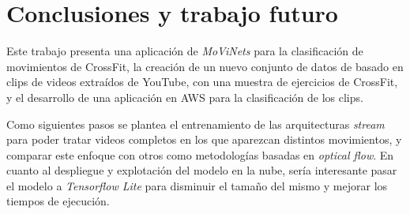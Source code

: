 \chapter{Conclusiones y trabajo futuro}\label{conclusiones}

Este trabajo presenta una aplicación de \textit{MoViNets} para la clasificación de movimientos de CrossFit, la creación de un nuevo conjunto de datos de basado en clips de videos extraídos de YouTube, con una muestra de ejercicios de CrossFit, y el desarrollo de una aplicación en AWS para la clasificación de los clips.

Como siguientes pasos se plantea el entrenamiento de las arquitecturas \textit{stream} para poder tratar videos completos en los que aparezcan distintos movimientos, y comparar este enfoque con otros como metodologías basadas en \textit{optical flow}. En cuanto al despliegue y explotación del modelo en la nube, sería interesante pasar el modelo a \textit{Tensorflow Lite} para disminuir el tamaño del mismo y mejorar los tiempos de ejecución.
